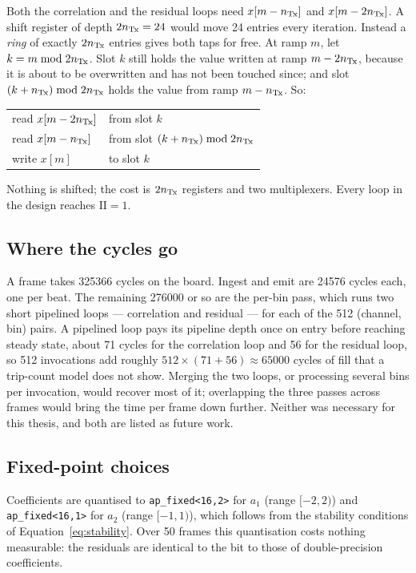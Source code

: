 Both the correlation and the residual loops need $x[m - n_{\mathrm{Tx}}]$ and
$x[m - 2n_{\mathrm{Tx}}]$. A shift register of depth $2n_{\mathrm{Tx}} = 24$ would move 24 entries
every iteration. Instead a \emph{ring} of exactly $2n_{\mathrm{Tx}}$ entries gives both
taps for free. At ramp $m$, let $k = m \bmod 2n_{\mathrm{Tx}}$. Slot $k$ still holds the
value written at ramp $m - 2n_{\mathrm{Tx}}$, because it is about to be overwritten and has
not been touched since; and slot $(k + n_{\mathrm{Tx}}) \bmod 2n_{\mathrm{Tx}}$ holds the value from
ramp $m - n_{\mathrm{Tx}}$. So:
\begin{center}
\begin{tabular}{@{}ll@{}}
read $x[m-2n_{\mathrm{Tx}}]$ & from slot $k$ \\
read $x[m-n_{\mathrm{Tx}}]$  & from slot $(k+n_{\mathrm{Tx}}) \bmod 2n_{\mathrm{Tx}}$ \\
write $x[m]$      & to slot $k$ \\
\end{tabular}
\end{center}
Nothing is shifted; the cost is $2n_{\mathrm{Tx}}$ registers and two multiplexers. Every
loop in the design reaches $\mathrm{II} = 1$.

\subsection{Where the cycles go}

A frame takes \num{325366} cycles on the board. Ingest and emit are
\num{24576} cycles each, one per beat. The remaining \num{276000} or so are the
per-bin pass, which runs two short pipelined loops --- correlation and residual
--- for each of the 512 (channel, bin) pairs. A pipelined loop pays its
pipeline depth once on entry before reaching steady state, about \num{71} cycles
for the correlation loop and \num{56} for the residual loop, so 512 invocations
add roughly $512 \times (71 + 56) \approx \num{65000}$ cycles of fill that a
trip-count model does not show. Merging the two loops, or processing several
bins per invocation, would recover most of it; overlapping the three passes
across frames would bring the time per frame down further. Neither was
necessary for this thesis, and both are listed as future work.

\subsection{Fixed-point choices}

Coefficients are quantised to \texttt{ap\_fixed<16,2>} for $a_1$ (range
$[-2,2)$) and \texttt{ap\_fixed<16,1>} for $a_2$ (range $[-1,1)$), which follows
from the stability conditions of Equation~\eqref{eq:stability}. Over 50 frames
this quantisation costs nothing measurable: the residuals are identical to the
bit to those of double-precision coefficients.

